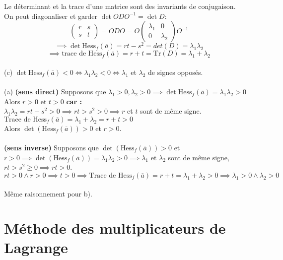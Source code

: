 \documentclass{article}
\begin{document}
Le déterminant et la trace d'une matrice sont des invariants de conjugaison.\\
On peut diagonaliser et garder $\det{ODO^{-1}} = \det{D}$:\\
\[ \begin{pmatrix}
r & s\\
s & t
\end{pmatrix} = ODO = O\begin{pmatrix}
\lambda_1 & 0\\
0 & \lambda_2
\end{pmatrix}O^{-1} \]
\[ \implies \det \text{Hess}_f(\overline{a}) = rt - s^2 = det(D) = \lambda_1\lambda_2 \]
\[ \implies \text{trace de } \text{Hess}_f(\overline{a}) = r + t = \text{Tr}(D) = \lambda_1 + \lambda_2 \]
\\
(c) $ \det \text{Hess}_f(\overline{a}) < 0 \Leftrightarrow \lambda_1\lambda_2 < 0 \Leftrightarrow \lambda_1 $ et $ \lambda_2 $ de signes opposés.\\\\
(a) \textbf{(sens direct)} Supposons que $ \lambda_1 > 0, \lambda_2 > 0 \implies \det  \text{Hess}_f(\overline{a}) = \lambda_1\lambda_2 > 0 $\\
Alors $ r > 0$ et $ t > 0 $ \textbf{car :}\\
$ \lambda_1\lambda_2 = rt - s^2 > 0 \implies rt > s^2 > 0 \implies r $ et $ t $ sont de même signe.\\
$ \text{Trace de } \text{Hess}_f(\overline{a}) = \lambda_1 + \lambda_2 = r + t > 0 $\\
Alors $ \det(\text{Hess}_f(\overline{a})) > 0 $ et $ r > 0 $.\\\\
\textbf{(sens inverse)} Supposons que $ \det(\text{Hess}_f(\overline{a})) > 0 $ et $ r > 0 \implies \det(\text{Hess}_f(\overline{a})) = \lambda_1\lambda_2 > 0 \implies \lambda_1 $ et $ \lambda_2 $ sont de même signe, $ rt > s^2 \geq 0 \implies rt > 0 $.\\
$ rt > 0 \wedge r > 0 \implies t > 0 \implies \text{Trace de Hess}_f(\overline{a}) = r + t = \lambda_1 + \lambda_2 > 0 \implies \lambda_1 > 0 \wedge \lambda_2 > 0 $\\\\
Même raisonnement pour b).

\newpage

\section{Méthode des multiplicateurs de Lagrange}
\end{document}
